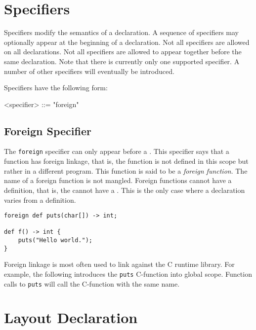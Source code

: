 \section{Specifiers} \label{guide:specifications}

Specifiers modify the semantics of a declaration. A sequence of specifiers may optionally appear at the beginning of a declaration. Not all specifiers are allowed on all declarations. Not all specifiers are allowed to appear together before the same declaration. Note that there is currently only one supported specifier. A number of other specifiers will eventually be introduced.

Specifiers have the following form:

\begin{grammar}
\singlespace
<specifier> ::= "foreign"
\end{grammar}

\subsection{Foreign Specifier} \label{guide:foreign_spec}

The \texttt{foreign} specifier can only appear before a . This specifier says that a function has foreign linkage, that is, the function is not defined in this scope but rather in a different program. This function is said to be a \textit{foreign function}. The name of a foreign function is not mangled. Foreign functions cannot have a definition, that is, the  cannot have a . This is the only case where a declaration varies from a definition.

\begin{minip}
\begin{lstlisting}
foreign def puts(char[]) -> int;

def f() -> int {
	puts("Hello world.");
}
\end{lstlisting}
\end{minip}

Foreign linkage is most often used to link against the C runtime library. For example, the following introduces the \texttt{puts} C-function into global scope. Function calls to \texttt{puts} will call the C-function with the same name.
 
\section{Layout Declaration} \label{guide:layout}

